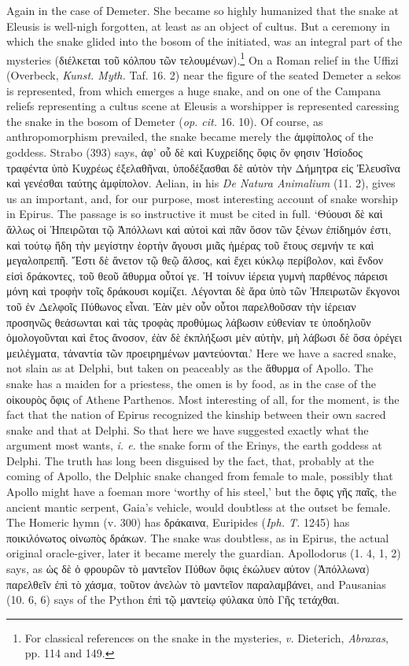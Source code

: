 \documentclass[a4paper, 11pt, oneside, polutonikogreek, english]{article}
\begin{document}
Again in the case of Demeter. She became so highly humanized that the snake at Eleusis is well-nigh forgotten, at least as an object of cultus. But a ceremony in which the snake glided into the bosom of the initiated, was an integral part of the mysteries (διέλκεται τοῦ κόλπου τῶν τελουμένων).\footnote{For classical references on the snake in the mysteries, \emph{v.} Dieterich, \emph{Abraxas}, pp. 114 and 149.} On a Roman relief in the Uffizi (Overbeck, \emph{Kunst. Myth.} Taf. 16. 2) near the figure of the seated Demeter a sekos is represented, from which emerges a huge snake, and on one of the Campana reliefs representing a cultus scene at Eleusis a worshipper is represented caressing the snake in the bosom of Demeter (\emph{op. cit.} 16. 10). Of course, as anthropomorphism prevailed, the snake became merely the ἀμφίπολος of the goddess. Strabo (393) says, ἀφ' οὗ δὲ καὶ Κυχρείδης ὄφις ὅν φησιν Ἡσίοδος τραφέντα ὑπὸ Κυχρέως ἐξελαθῆναι, ὑποδέξασθαι δὲ αὐτὸν τὴν Δήμητρα εἰς Ἐλευσῖνα καὶ γενέσθαι ταύτης ἀμφίπολον. Aelian, in his \emph{De Natura Animalium} (11. 2), gives us an important, and, for our purpose, most interesting account of snake worship in Epirus. The passage is so instructive it must be cited in full. `Θύουσι δὲ καὶ ἄλλως οἱ Ἠπειρῶται τῷ Ἀπόλλωνι καὶ αὐτοὶ καὶ πᾶν ὅσον τῶν ξένων ἐπίδημόν ἐστι, καὶ τούτῳ ἤδη τὴν μεγίστην ἑορτὴν ἄγουσι μιᾶς ἡμέρας τοῦ ἔτους σεμνήν τε καὶ μεγαλοπρεπῆ. Ἔστι δὲ ἄνετον τῷ θεῷ ἄλσος, καὶ ἔχει κύκλῳ περίβολον, καὶ ἔνδον εἰσὶ δράκοντες, τοῦ θεοῦ ἄθυρμα οὗτοί γε. Ἡ τοίνυν ἱέρεια γυμνὴ παρθένος πάρεισι μόνη καὶ τροφὴν τοῖς δράκουσι κομίζει. Λέγονται δὲ ἄρα ὑπὸ τῶν Ἠπειρωτῶν ἔκγονοι τοῦ ἐν Δελφοῖς Πύθωνος εἶναι. Ἐὰν μὲν οὖν οὗτοι παρελθοῦσαν τὴν ἱέρειαν προσηνῶς θεάσωνται καὶ τὰς τροφὰς προθύμως λάβωσιν εὐθενίαν τε ὑποδηλοῦν ὁμολογοῦνται καὶ ἔτος ἄνοσον, ἐὰν δὲ ἐκπλήξωσι μὲν αὐτὴν, μὴ λάβωσι δὲ ὅσα ὀρέγει μειλέγματα, τἀναντία τῶν προειρημένων μαντεύονται.' Here we have a sacred snake, not slain as at Delphi, but taken on peaceably as the ἄθυρμα of Apollo. The snake has a maiden for a priestess, the omen is by food, as in the case of the οἰκουρὸς ὄφις of Athene Parthenos. Most interesting of all, for the moment, is the fact that the nation of Epirus recognized the kinship between their own sacred snake and that at Delphi. So that here we have suggested exactly what the argument most wants, \emph{i. e.} the snake form of the Erinys, the earth goddess at Delphi. The truth has long been disguised by the fact, that, probably at the coming of Apollo, the Delphic snake changed from female to male, possibly that Apollo might have a foeman more `worthy of his steel,' but the ὄφις γῆς παῖς, the ancient mantic serpent, Gaia's vehicle, would doubtless at the outset be female. The Homeric hymn (v. 300) has δράκαινα, Euripides (\emph{Iph. T.} 1245) has ποικιλόνωτος οἰνωπὸς δράκων. The snake was doubtless, as in Epirus, the actual original oracle-giver, later it became merely the guardian. Apollodorus (1. 4, 1, 2) says, as ὡς δὲ ὁ φρουρῶν τὸ μαντεῖον Πύθων ὄφις ἐκώλυεν αὐτον (Ἀπόλλωνα) παρελθεῖν ἐπὶ τὸ χάσμα, τοῦτον ἀνελὼν τὸ μαντεῖον παραλαμβάνει, and Pausanias (10. 6, 6) says of the Python ἐπὶ τῷ μαντείῳ φύλακα ὑπὸ Γῆς τετάχθαι.
\end{document}
